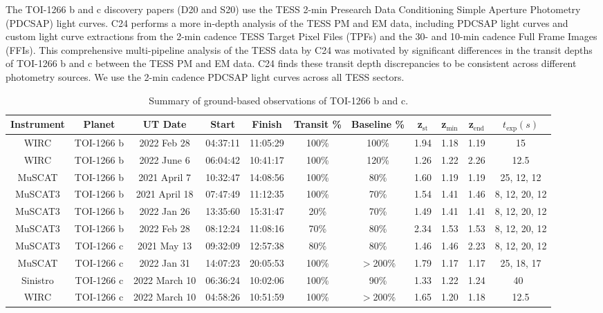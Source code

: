\documentclass[twocolumn]{aastex631}
\begin{document}
The TOI-1266 b and c discovery papers (D20 and S20) use the TESS 2-min Presearch Data Conditioning Simple Aperture Photometry (PDCSAP) light curves. C24 performs a more in-depth analysis of the TESS PM and EM data, including PDCSAP light curves and custom light curve extractions from the 2-min cadence TESS Target Pixel Files (TPFs) and the 30- and 10-min cadence Full Frame Images (FFIs). This comprehensive multi-pipeline analysis of the TESS data by C24 was motivated by significant differences in the transit depths of TOI-1266 b and c between the TESS PM and EM data. C24 finds these transit depth discrepancies to be consistent across different photometry sources. We use the 2-min cadence PDCSAP light curves across all TESS sectors. 

\begin{table}
\caption{Summary of ground-based observations of TOI-1266 b and c.}
\label{tab:Palomar obs}
\centering
\begin{tabular}{ccccccccccc}
\hline
\hline
Instrument & Planet & UT Date & Start & Finish & Transit \% & Baseline \% & z$_{\text{st}}$ &  z$_{\text{min}}$ & z$_{\text{end}}$ & $t_{\text{exp}} (s)$ 
\\ \hline
WIRC & TOI-1266 b & 2022 Feb 28 & 04:37:11 & 11:05:29 & 100\% & 100\% & 1.94 & 1.18 & 1.19 & 15
\\ %
WIRC & TOI-1266 b & 2022 June 6 & 06:04:42 & 10:41:17 & 100\% & 120\% & 1.26 & 1.22 & 2.26 & 12.5 
\\ %
MuSCAT & TOI-1266 b & 2021 April 7 & 10:32:47 & 14:08:56 & 100\% & 80\% & 1.60 & 1.19 & 1.19 & 25, 12, 12
\\
MuSCAT3 & TOI-1266 b & 2021 April 18 & 07:47:49 & 11:12:35 & 100\% & 70\% & 1.54 & 1.41 & 1.46 & 8, 12, 20, 12 
\\
MuSCAT3 & TOI-1266 b & 2022 Jan 26 & 13:35:60 & 15:31:47 & 20\% & 70\% & 1.49 & 1.41 & 1.41 & 8, 12, 20, 12 
\\
MuSCAT3 & TOI-1266 b & 2022 Feb 28 & 08:12:24 & 11:08:16 & 70\% & 80\% & 2.34 & 1.53 & 1.53 & 8, 12, 20, 12 
\\ \hline
MuSCAT3 & TOI-1266 c & 2021 May 13 & 09:32:09 & 12:57:38 & 80\% & 80\% & 1.46 & 1.46 & 2.23 & 8, 12, 20, 12 
\\
MuSCAT & TOI-1266 c & 2022 Jan 31 & 14:07:23 & 20:05:53 & 100\% & $>$200\% & 1.79 & 1.17 & 1.17 & 25, 18, 17 
\\
Sinistro & TOI-1266 c & 2022 March 10 & 06:36:24 & 10:02:06 & 100\% & 90\% & 1.33 & 1.22 & 1.24 & 40\
\\
WIRC & TOI-1266 c & 2022 March 10 & 04:58:26 & 10:51:59 & 100\% & $>$200\% & 1.65 & 1.20 & 1.18 & 12.5 

\end{tabular}
\end{table}
\end{document}
